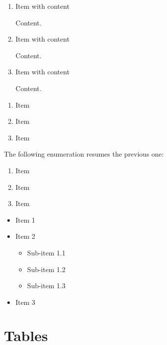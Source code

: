 \begin{enumerate}

    \item Item with content
    
Content. 

    \item Item with content
    
Content. 

    \item Item with content
    
Content. 

\end{enumerate}
\bigbreak

\begin{enumerate}
    \item Item
    \item Item
    \item Item
\end{enumerate}
The following enumeration resumes the previous one:
\begin{enumerate}[resume]
    \item Item
    \item Item
    \item Item
\end{enumerate}
\bigbreak

\begin{itemize}
    \item Item 1
    \item Item 2
        \begin{itemize}
            \item Sub-item 1.1
            \item Sub-item 1.2
            \item Sub-item 1.3
        \end{itemize}
    \item Item 3
\end{itemize}
\bigbreak

\begin{basedescript}{%
  \desclabelstyle{\multilinelabel}
  \desclabelwidth{3cm}}

\item[This is an item] \lipsum[25] 

\end{basedescript}

\newpage


\section{Tables}

